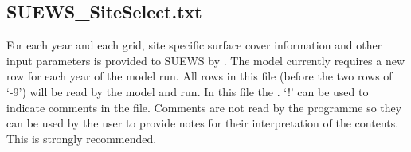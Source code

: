 \documentclass[letterpaper,10pt,english]{sphinxmanual}
\begin{document}
\subsection{SUEWS\_SiteSelect.txt}
\label{\detokenize{input_files/SUEWS_SiteInfo/SUEWS_SiteSelect::doc}}\label{\detokenize{input_files/SUEWS_SiteInfo/SUEWS_SiteSelect:suews-siteselect-txt}}
For each year and each grid, site specific surface cover information and
other input parameters is provided to SUEWS by .
The model currently requires a new row for each year of the model run.
All rows in this file (before the two rows of ‘-9’) will be read by the
model and run. In this file the . ‘!’ can
be used to indicate comments in the file. Comments are not read by the
programme so they can be used by the user to provide notes for their
interpretation of the contents. This is strongly recommended.
\end{document}
